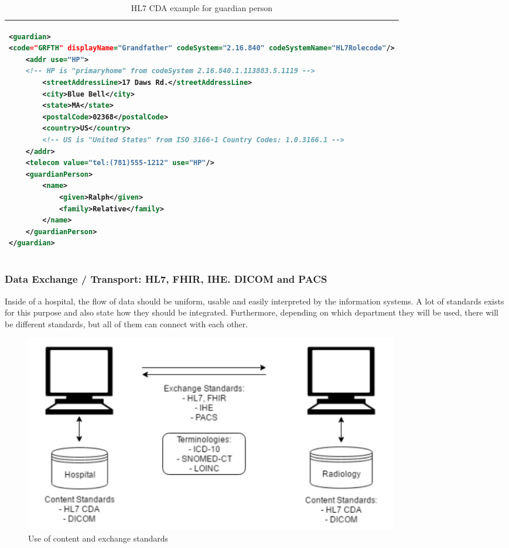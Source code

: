 \documentclass[mim_thesis.tex]{subfiles}
\begin{document}
\begin{table}[H]
\caption{HL7 CDA example for guardian person}
\label{tab:hl7_cda}
\begin{tabular}{l}
\toprule[2pt]
\begin{lstlisting}[language=XML]
<guardian>
<code="GRFTH" displayName="Grandfather" codeSystem="2.16.840" codeSystemName="HL7Rolecode"/>
	<addr use="HP">
	<!-- HP is "primaryhome" from codeSystem 2.16.840.1.113883.5.1119 -->
		<streetAddressLine>17 Daws Rd.</streetAddressLine>
		<city>Blue Bell</city>
		<state>MA</state>
		<postalCode>02368</postalCode>
		<country>US</country>
		<!-- US is "United States" from ISO 3166-1 Country Codes: 1.0.3166.1 -->
	</addr>
	<telecom value="tel:(781)555-1212" use="HP"/>
	<guardianPerson>
		<name>
			<given>Ralph</given>
			<family>Relative</family>
		</name>
	</guardianPerson>
</guardian>
\end{lstlisting}
\tabularnewline \bottomrule[2pt]
\end{tabular}
\end{table}

\newpage
\subsubsection{Data Exchange / Transport: HL7, FHIR, IHE. DICOM and PACS }
Inside of a hospital, the flow of data should be uniform, usable and easily interpreted by the information systems. A lot of standards exists for this purpose and also state how they should be integrated. Furthermore, depending on which department they will be used, there will be different standards, but all of them can connect with each other.

\begin{figure}[H]
	\centering
    \includegraphics[width=0.80\textwidth]{img/content_exchage_standards.PNG}
	\caption{Use of content and exchange standards }
	\label{fig:content_exchage_standards}
\end{figure}
\end{document}
